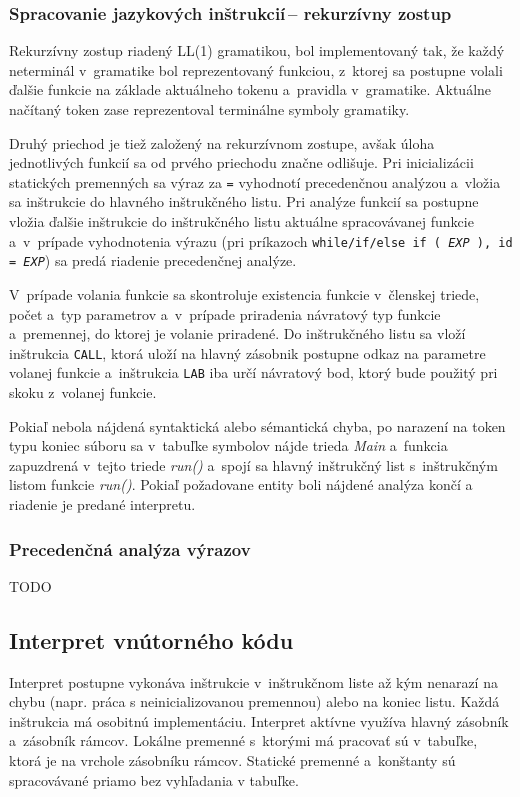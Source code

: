 \documentclass[11pt,a4paper]{article}
\begin{document}
        \subsubsection{Spracovanie jazykových inštrukcií\,-- rekurzívny zostup}
        \label{rekurzia}
        Rekurzívny zostup riadený LL(1) gramatikou, bol implementovaný tak, že každý neterminál v~gramatike bol reprezentovaný funkciou,
        z~ktorej sa postupne volali ďalšie funkcie na základe aktuálneho tokenu a~pravidla v~gramatike. Aktuálne načítaný token zase reprezentoval
        terminálne symboly gramatiky.

        Druhý priechod je tiež založený na rekurzívnom zostupe, avšak úloha jednotlivých funkcií sa od prvého priechodu značne odlišuje.
        Pri inicializácii statických premenných sa výraz za \texttt{=} vyhodnotí precedenčnou analýzou a~vložia sa inštrukcie do hlavného
        inštrukčného listu. Pri analýze funkcií sa postupne vložia ďalšie inštrukcie do inštrukčného listu aktuálne spracovávanej funkcie
        a~v~prípade vyhodnotenia výrazu (pri príkazoch
        \texttt{while/if/else if ( \emph{EXP} ), id = \emph{EXP}}) sa predá riadenie precedenčnej analýze.

        V~prípade volania funkcie sa skontroluje existencia funkcie v~členskej triede, počet a~typ parametrov a~v~prípade priradenia
        návratový typ funkcie a~premennej, do ktorej je volanie priradené.
        Do inštrukčného listu sa vloží inštrukcia \texttt{CALL}, ktorá uloží na hlavný zásobnik postupne odkaz na parametre
        volanej funkcie a~inštrukcia \texttt{LAB} iba určí návratový bod, ktorý bude použitý pri skoku z~volanej funkcie.

        Pokiaľ nebola nájdená syntaktická alebo sémantická chyba, po narazení na token typu koniec súboru sa v~tabuľke symbolov nájde
        trieda \emph{Main} a~funkcia zapuzdrená v~tejto triede \emph{run()} a~spojí sa hlavný inštrukčný list s~inštrukčným listom funkcie
        \emph{run()}. Pokiaľ požadovane entity boli nájdené analýza končí a riadenie je predané interpretu.

        \subsubsection{Precedenčná analýza výrazov}
        \label{precedencna analyza}
    TODO
    
    \subsection{Interpret vnútorného kódu}
    \label{interpret}
    Interpret postupne vykonáva inštrukcie v~inštrukčnom liste až kým nenarazí na chybu (napr. práca s neinicializovanou premennou)
    alebo na koniec listu. Každá inštrukcia má osobitnú implementáciu. Interpret aktívne využíva hlavný zásobník a~zásobník rámcov.
    Lokálne premenné s~ktorými má pracovať  sú v~tabuľke, ktorá je na vrchole zásobníku rámcov. Statické premenné a~konštanty sú spracovávané
    priamo bez vyhľadania v tabuľke.
\end{document}

